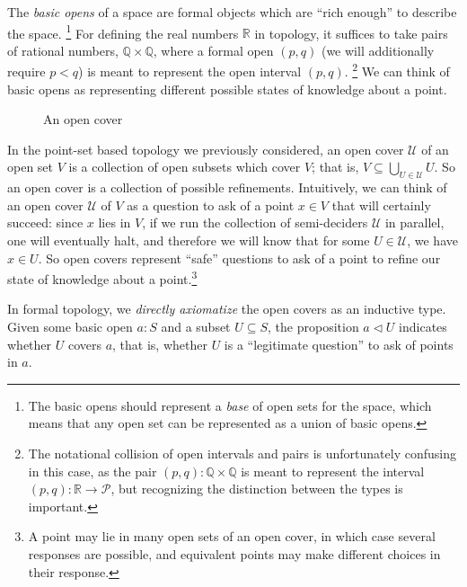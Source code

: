 \documentclass{article}
\newcommand{\cov}{\vartriangleleft}
\newcommand{\rat}{\mathbb{Q}}
\newcommand{\R}{\mathbb{R}}
\newcommand{\Prop}{\mathcal{P}}
\begin{document}
The \emph{basic opens} of a space are formal objects which are ``rich enough'' to describe the space. 
\footnote{The basic opens should represent a \emph{base} of open sets for the space, which means that any open set can be represented as a union of basic opens.}
For defining the real numbers $\R$ in topology, it suffices to take pairs of rational numbers, $\rat \times \rat$, where a formal open $(p, q)$ (we will additionally require $p < q$) is meant to represent the open interval $(p, q)$.
\footnote{The notational collision of open intervals and pairs is unfortunately confusing in this case, as the pair $(p, q) : \rat \times \rat$ is meant to represent the interval $(p, q) : \R \to \Prop$, but recognizing the distinction between the types is important.}
We can think of basic opens as representing different possible states of knowledge about a point.

\begin{figure}[h]
\begin{center}
\end{center}
\caption{An open cover}
\end{figure}

In the point-set based topology we previously considered, an open cover $\mathcal{U}$ of an open set $V$ is a collection of open subsets which cover $V$; that is, $V \subseteq \bigcup_{U \in \mathcal{U}} U$. So an open cover is a collection of possible refinements. Intuitively, we can think of an open cover $\mathcal{U}$ of $V$ as a question to ask of a point $x \in V$ that will certainly succeed: since $x$ lies in $V$, if we run the collection of semi-deciders $\mathcal{U}$ in parallel, one will eventually halt, and therefore we will know that for some $U \in \mathcal{U}$, we have $x \in U$. So open covers represent ``safe'' questions to ask of a point to refine our state of knowledge about a point.\footnote{A point may lie in many open sets of an open cover, in which case several responses are possible, and equivalent points may make different choices in their response.}

In formal topology, we \emph{directly axiomatize} the open covers as an inductive type. Given some basic open $a : S$ and a subset $U \subseteq S$, the proposition $a \cov U$ indicates whether $U$ covers $a$, that is, whether $U$ is a ``legitimate question'' to ask of points in $a$.
\end{document}
